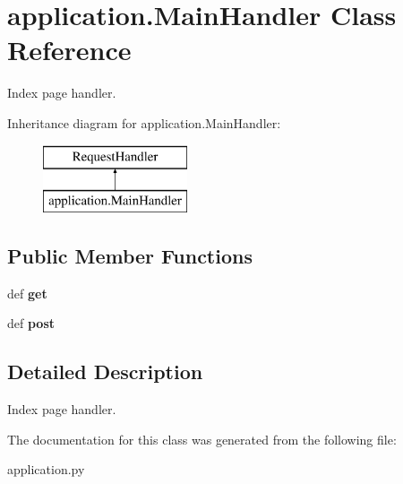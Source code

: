\hypertarget{classapplication_1_1_main_handler}{\section{application.\-Main\-Handler Class Reference}
\label{classapplication_1_1_main_handler}
}


Index page handler.  


Inheritance diagram for application.\-Main\-Handler\-:\begin{figure}[H]
\begin{center}
\leavevmode
\includegraphics[height=2.000000cm]{classapplication_1_1_main_handler}
\end{center}
\end{figure}
\subsection*{Public Member Functions}
\begin{DoxyCompactItemize}
\item 
\hypertarget{classapplication_1_1_main_handler_ae71c755ef5ff2ae9b026ebdbaf60ea69}{def {\bfseries get}}\label{classapplication_1_1_main_handler_ae71c755ef5ff2ae9b026ebdbaf60ea69}

\item 
\hypertarget{classapplication_1_1_main_handler_a1a3a3173b0d11ed6d67b0a8259adc0e8}{def {\bfseries post}}\label{classapplication_1_1_main_handler_a1a3a3173b0d11ed6d67b0a8259adc0e8}

\end{DoxyCompactItemize}


\subsection{Detailed Description}
Index page handler. 

The documentation for this class was generated from the following file\-:\begin{DoxyCompactItemize}
\item 
application.\-py\end{DoxyCompactItemize}

